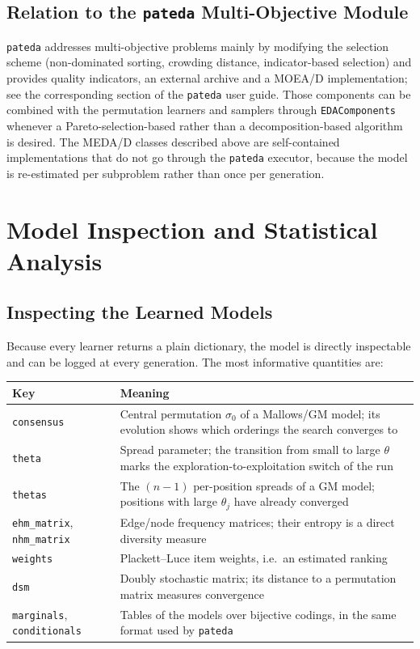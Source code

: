 \documentclass[a4paper,11pt]{article}
\begin{document}
\subsection{Relation to the \texttt{pateda} Multi-Objective Module}

\texttt{pateda} addresses multi-objective problems mainly by modifying the
selection scheme (non-dominated sorting, crowding distance, indicator-based
selection) and provides quality indicators, an external archive and a MOEA/D
implementation; see the corresponding section of the \texttt{pateda} user guide.
Those components can be combined with the permutation learners and samplers
through \texttt{EDAComponents} whenever a Pareto-selection-based rather than a
decomposition-based algorithm is desired.  The MEDA/D classes described above are
self-contained implementations that do not go through the \texttt{pateda}
executor, because the model is re-estimated per subproblem rather than once per
generation.

\section{Model Inspection and Statistical Analysis}
\label{sec:knowledge}

\subsection{Inspecting the Learned Models}

Because every learner returns a plain dictionary, the model is directly
inspectable and can be logged at every generation.  The most informative
quantities are:

\begin{center}
\begin{tabular}{lp{8.6cm}}
\toprule
\textbf{Key} & \textbf{Meaning} \\
\midrule
\texttt{consensus} & Central permutation $\sigma_0$ of a Mallows/GM model; its
  evolution shows which orderings the search converges to \\
\texttt{theta} & Spread parameter; the transition from small to large $\theta$
  marks the exploration-to-exploitation switch of the run \\
\texttt{thetas} & The $(n-1)$ per-position spreads of a GM model; positions with
  large $\theta_j$ have already converged \\
\texttt{ehm\_matrix}, \texttt{nhm\_matrix} & Edge/node frequency matrices; their
  entropy is a direct diversity measure \\
\texttt{weights} & Plackett--Luce item weights, i.e.\ an estimated ranking \\
\texttt{dsm} & Doubly stochastic matrix; its distance to a permutation matrix
  measures convergence \\
\texttt{marginals}, \texttt{conditionals} & Tables of the models over bijective
  codings, in the same format used by \texttt{pateda} \\
\bottomrule
\end{tabular}
\end{center}
\end{document}
